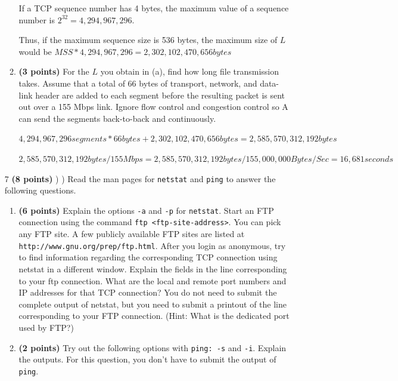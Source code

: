 \documentclass{article}
\begin{document}
\begin{enumerate}
\begin{enumerate}
  If a TCP sequence number has 4 bytes, the maximum value of a sequence number is $2^{32} = 4,294,967,296$. 

  Thus, if the maximum sequence size is 536 bytes, the maximum size of $L$ would be $MSS * 4,294,967,296 = 2,302,102,470,656 bytes$

  \item \textbf{(3 points)} For the $L$ you obtain in (a), find how long file transmission takes. Assume that a total of 66 bytes of transport, network, and data-link header are added to each segment before the resulting packet is sent out over a 155 Mbps link. Ignore flow control and congestion control so A can send the segments back-to-back and continuously.

  $4,294,967,296 segments * 66 bytes + 2,302,102,470,656 bytes =  2,585,570,312,192 bytes$

  $2,585,570,312,192 bytes / 155 Mbps = 2,585,570,312,192 bytes / 155,000,000 Bytes/Sec = 16,681 seconds$

  \end{enumerate}

\item[7]\textbf{(8 points)} ) ) Read the man pages for \texttt{netstat} and \texttt{ping} to answer the following questions.

  \begin{enumerate}
  \item \textbf{(6 points)} Explain the options \texttt{-a} and \texttt{-p} for \texttt{netstat}. Start an FTP connection using the command \texttt{ftp <ftp-site-address>}. You can pick any FTP site. A few publicly available FTP sites are listed at \texttt{http://www.gnu.org/prep/ftp.html}. After you login as anonymous, try to find information regarding the corresponding TCP connection using netstat in a different window. Explain the fields in the line corresponding to your ftp connection. What are the local and remote port numbers and IP addresses for that TCP connection? You do not need to submit the complete output of netstat, but you need to submit a printout of the line corresponding to your FTP connection. (Hint: What is the dedicated port used by FTP?)

  \item \textbf{(2 points)} Try out the following options with \texttt{ping: -s} and \texttt{-i}. Explain the outputs. For this question, you don’t have to submit the output of \texttt{ping}.

  \end{enumerate}
\end{enumerate}
\end{document}
